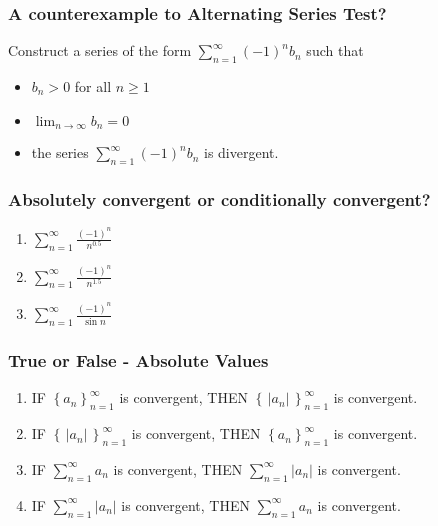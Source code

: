 \documentclass[14pt]{beamer}
\newcommand {\DS} [1] {${\displaystyle #1}$}
\newcommand{\azul}[1]{{\color{blue} #1}}
\newcommand{\rojo}[1]{{\color{red} #1}}
\newcommand{\setsize}[1]{\fontsize{#1}{#1}\selectfont} %
\newcommand{\smallerfont}{\setsize{13}} %
\newcommand{\vv}{\vspace{.5cm}}
\newcommand{\vvv}{\vspace{.2cm}}
\begin{document}
\begin{frame}[t]
\frametitle{A counterexample to Alternating Series Test?} 

Construct a series of the form \DS{\sum_{n=1}^{\infty} (-1)^n b_n} such that
	\begin{itemize}
		\item  \DS{b_n >0} for all $n \geq 1$
		\vspace{.4cm}
		\item  \DS{\lim_{n \to \infty} b_n = 0}
		\item  the series \DS{\sum_{n=1}^{\infty} (-1)^n b_n} is divergent.
	\end{itemize}

\end{frame}
\begin{frame}[t]
\frametitle{Absolutely convergent or conditionally convergent?}

\begin{enumerate}
	\item  \DS{\sum_{n=1}^{\infty} \frac{(-1)^n}{n^{0.5}}}
\vv
	\item  \DS{\sum_{n=1}^{\infty} \frac{(-1)^n}{n^{1.5}}}
\vv
	\item \DS{\sum_{n=1}^{\infty} \frac{(-1)^n}{\sin n}}
\vv
\end{enumerate}

\end{frame}
\begin{frame}[t]
\smallerfont
\frametitle{ True or False - Absolute Values}

\begin{enumerate}
	\item  IF \azul{\DS{\left\{ a_n \right\}_{n=1}^{\infty}}} is convergent, \quad THEN \rojo{\DS{\left\{ \, |a_n| \, \right\}_{n=1}^{\infty}}} is convergent.
\vv	
	\item  IF \rojo{\DS{\left\{ \, |a_n| \, \right\}_{n=1}^{\infty}}} is convergent, \quad THEN \azul{\DS{\left\{ a_n \right\}_{n=1}^{\infty}}} is convergent.
\vv	
	\item  IF \; \azul{\DS{\sum_{n=1}^{\infty} a_n }} \; is convergent, \quad THEN \; \rojo{ \DS{\sum_{n=1}^{\infty} |a_n| }} \; is convergent.
\vvv	
	\item  IF \; \rojo{\DS{\sum_{n=1}^{\infty} |a_n| }} \; is convergent, \quad THEN \; \azul{\DS{\sum_{n=1}^{\infty} a_n }} \; is convergent.
\end{enumerate}

\end{frame}
\end{document}
